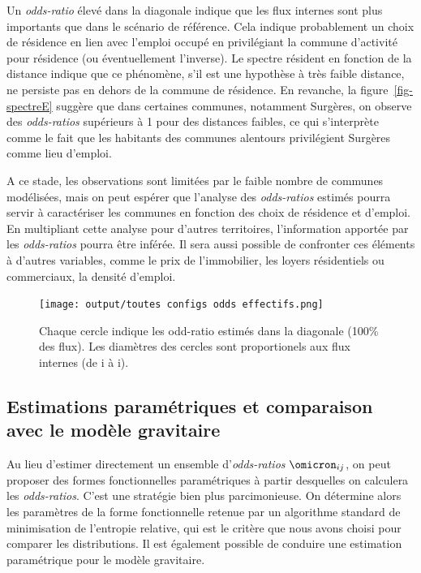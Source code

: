 \documentclass[
  10pt,
  a4paper,
  numbers=noendperiod,
  DIV=9]{scrartcl}
\begin{document}
Un \emph{odds-ratio} élevé dans la diagonale indique que les flux
internes sont plus importants que dans le scénario de référence. Cela
indique probablement un choix de résidence en lien avec l'emploi occupé
en privilégiant la commune d'activité pour résidence (ou éventuellement
l'inverse). Le spectre résident en fonction de la distance indique que
ce phénomène, s'il est une hypothèse à très faible distance, ne persiste
pas en dehors de la commune de résidence. En revanche, la
figure~\ref{fig-spectreE} suggère que dans certaines communes, notamment
Surgères, on observe des \emph{odds-ratios} supérieurs à 1 pour des
distances faibles, ce qui s'interprète comme le fait que les habitants
des communes alentours privilégient Surgères comme lieu d'emploi.

A ce stade, les observations sont limitées par le faible nombre de
communes modélisées, mais on peut espérer que l'analyse des
\emph{odds-ratios} estimés pourra servir à caractériser les communes en
fonction des choix de résidence et d'emploi. En multipliant cette
analyse pour d'autres territoires, l'information apportée par les
\emph{odds-ratios} pourra être inférée. Il sera aussi possible de
confronter ces éléments à d'autres variables, comme le prix de
l'immobilier, les loyers résidentiels ou commerciaux, la densité
d'emploi.

\begin{figure}[htb]

{\centering \texttt{[image: output/toutes configs odds effectifs.png]}

}

\caption[Odd-ratio dans la diagonale]{\label{fig-carteodd}Chaque cercle
indique les odd-ratio estimés dans la diagonale (100\% des flux). Les
diamètres des cercles sont proportionels aux flux internes (de i à i).}

\end{figure}

\hypertarget{estimations-paramuxe9triques-et-comparaison-avec-le-moduxe8le-gravitaire}{%
\subsection{Estimations paramétriques et comparaison avec le modèle
gravitaire}\label{estimations-paramuxe9triques-et-comparaison-avec-le-moduxe8le-gravitaire}}

Au lieu d'estimer directement un ensemble d'\emph{odds-ratios}
\(\omicron_{ij}\), on peut proposer des formes fonctionnelles
paramétriques à partir desquelles on calculera les \emph{odds-ratios}.
C'est une stratégie bien plus parcimonieuse. On détermine alors les
paramètres de la forme fonctionnelle retenue par un algorithme standard
de minimisation de l'entropie relative, qui est le critère que nous
avons choisi pour comparer les distributions. Il est également possible
de conduire une estimation paramétrique pour le modèle gravitaire.
\end{document}
